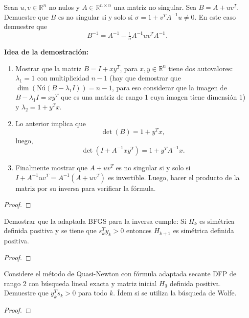 \documentclass{article}
\newenvironment{theorem}[2][Ejercicio]{\begin{trivlist}
\item[\hskip \labelsep {\bfseries #1}\hskip \labelsep {\bfseries #2.}]}{\end{trivlist}}
\begin{document}
\begin{theorem}{7}
    Sean \(u, v \in \mathbb{R}^n\) no nulos y \(A \in \mathbb{R}^{n \times n}\) una matriz no singular.
    Sea \( B = A + u v^T \). Demuestre que \(B\) es no singular si y solo si
    \(\sigma = 1 + v^T A^{-1} u \neq 0\). En este caso demuestre que
    \[
        B^{-1} = A^{-1} - \tfrac{1}{\sigma} A^{-1} u v^T A^{-1}.
    \]

    \textbf{Idea de la demostración:}
    \begin{enumerate}
        \item[(a)] Mostrar que la matriz \(B = I + xy^T\), para \(x,y \in \mathbb{R}^n\)
              tiene dos autovalores: \(\lambda_1 = 1\) con multiplicidad \(n-1\)
              (hay que demostrar que \(\dim(\text{Nú}(B - \lambda_1 I)) = n-1\),
              para eso considerar que la imagen de \(B - \lambda_1 I = xy^T\) que es una matriz de rango 1
              cuya imagen tiene dimensión 1) y \(\lambda_2 = 1 + y^T x\).

        \item[(b)] Lo anterior implica que
              \[
                  \det(B) = 1 + y^T x,
              \]
              luego,
              \[
                  \det(I + A^{-1} x y^T) = 1 + y^T A^{-1} x.
              \]

        \item[(c)] Finalmente mostrar que \(A + uv^T\) es no singular si y solo si
              \(I + A^{-1} u v^T = A^{-1} (A + uv^T)\) es invertible.
              Luego, hacer el producto de la matriz por su inversa para verificar la fórmula.
    \end{enumerate}
\end{theorem}

\begin{proof}

\end{proof}
\vspace{0.25in}

\begin{theorem}{8}
    Demostrar que la adaptada BFGS para la inversa cumple:
    Si \(H_k\) es simétrica definida positiva y se tiene que \(s_k^T y_k > 0\)
    entonces \(H_{k+1}\) es simétrica definida positiva.
\end{theorem}

\begin{proof}

\end{proof}
\vspace{0.25in}

\begin{theorem}{9}
    Considere el método de Quasi-Newton con fórmula adaptada secante DFP de rango 2
    con búsqueda lineal exacta y matriz inicial \(H_0\) definida positiva.
    Demuestre que \(y_k^T s_k > 0\) para todo \(k\).
    Ídem si se utiliza la búsqueda de Wolfe.
\end{theorem}

\begin{proof}

\end{proof}
\vspace{0.25in}
\end{document}

